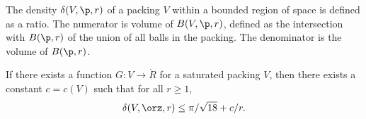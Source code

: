 


The density $\delta( V,\p,r)$ of a packing $ V$ within a bounded
region of space is defined as a ratio. The numerator is volume of
$B(V,\p,r)$, defined as the intersection with $B(\p,r)$ of the union
of all balls in the packing.  The denominator is the volume of
$B(\p,r)$. 
%
%


\begin{lemma} 
\label{lemma:deltabound} %
If there exists a  
function $G: V\to\ring{R}$ for a saturated packing $ V$, then there
exists a constant $c=c(V)$ such that for all $r\ge1$,
\[  
\delta( V,\orz,r)
\le \pi/\sqrt{18} + c/r.
\] 
\end{lemma}




